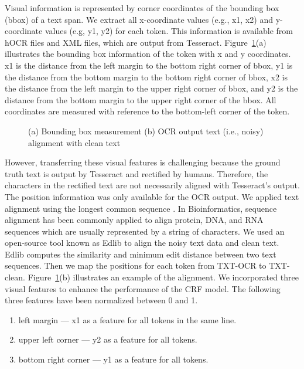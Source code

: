 \documentclass{article}
\begin{document}
Visual information is represented by corner coordinates of the bounding box (bbox) of a text span. We extract all x-coordinate values (e.g., x1, x2) and y-coordinate values (e.g, y1, y2) for each token. This information is available from hOCR files and XML files, which are output from Tesseract. Figure~\ref{fig:bbox and text-alignment}(a) illustrates the bounding box information of the token with x and y coordinates. x1 is the distance from the left margin to the bottom right corner of bbox, y1 is the distance from the bottom margin to the bottom right corner of bbox, x2 is the distance from the left margin to the upper right corner of bbox, and y2 is the distance from the bottom margin to the upper right corner of the bbox. All coordinates are measured with reference to the bottom-left corner of the token.

\begin{figure}[htp]
    \centering
    \newline
{}
    \caption{(a) Bounding box measurement (b) OCR output text (i.e., noisy) alignment with clean text}\label{fig:bbox and text-alignment}\end{figure}

However, transferring these visual features is challenging because the ground truth text is output by Tesseract and rectified by humans. Therefore, the characters in the rectified text are not necessarily aligned with Tesseract's output. The position information was only available for the OCR output. We applied text alignment using the longest common sequence \cite{sequence-align}. In Bioinformatics, sequence alignment has been commonly applied to align protein, DNA, and RNA sequences which are usually represented by a string of characters. We used an open-source tool known as Edlib \cite{edlib} to align the noisy text data and clean text. Edlib computes the similarity and minimum edit distance between two text sequences. Then we map the positions for each token from TXT-OCR to TXT-clean. Figure~\ref{fig:bbox and text-alignment}(b) illustrates an example of the alignment. We incorporated three visual features to enhance the performance of the CRF model. The following three features have been normalized between 0 and 1.

\begin{enumerate}
    \item left margin --- x1 as a feature for all tokens in the same line.
    \item upper left corner --- y2 as a feature for all tokens.
    \item bottom right corner ---  y1 as a feature for all tokens. 
\end{enumerate}
\end{document}
